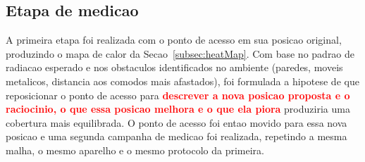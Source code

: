 \subsection{Etapa de medicao}

A primeira etapa foi realizada com o ponto de acesso em sua posicao original, produzindo o mapa de calor da Secao~\ref{subsec:heatMap}. Com base no padrao de radiacao esperado e nos obstaculos identificados no ambiente (paredes, moveis metalicos, distancia aos comodos mais afastados), foi formulada a hipotese de que reposicionar o ponto de acesso para \textcolor{red}{\textbf{descrever a nova posicao proposta e o raciocinio, o que essa posicao melhora e o que ela piora}} produziria uma cobertura mais equilibrada. O ponto de acesso foi entao movido para essa nova posicao e uma segunda campanha de medicao foi realizada, repetindo a mesma malha, o mesmo aparelho e o mesmo protocolo da primeira.